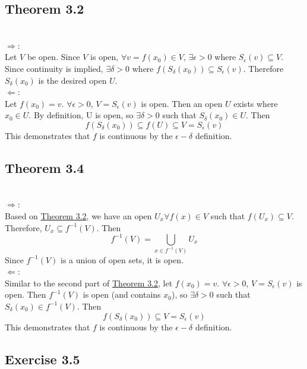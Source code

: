 \subsection{Theorem 3.2} \label{thm4.3.2}
\setcounter{question}{0}

 
 
\begin{solution}
 \\$\Rightarrow$: \\
 Let $V$ be open. Since $V$ is open, $\forall v = f(x_0) \in V$, $\exists \epsilon > 0$ where $S_\epsilon(v) \subseteq V$. Since continuity is implied, $\exists \delta > 0$ where $f(S_\delta(x_0)) \subseteq S_\epsilon(v)$. Therefore $S_\delta(x_0)$ is the desired open $U$. \\
 $\Leftarrow$: \\
 Let $f(x_0) = v$. $\forall \epsilon > 0$, $V = S_\epsilon(v)$ is open. Then an open $U$ exists where $x_0 \in U$. By definition, U is open, so $\exists \delta > 0$ such that $S_\delta(x_0) \in U$. Then
 $$f(S_\delta(x_0)) \subseteq f(U) \subseteq V = S_\epsilon(v)$$
 This demonstrates that $f$ is continuous by the $\epsilon-\delta$ definition.
\end{solution}

\subsection{Theorem 3.4}
\setcounter{question}{0}


\begin{solution}
 \\$\Rightarrow$: \\
 Based on \hyperref[thm4.3.2]{Theorem 3.2}, we have an open $U_x \forall f(x) \in V$ such that $f(U_x) \subseteq V$. Therefore, $U_x \subseteq f^{-1}(V)$. Then
 $$f^{-1}(V) = \bigcup_{x \in f^{-1}(V)} U_x$$
 Since $f^{-1}(V)$ is a union of open sets, it is open. \\
 $\Leftarrow$: \\
 Similar to the second part of \hyperref[thm4.3.2]{Theorem 3.2}, let $f(x_0) = v$. $\forall \epsilon > 0$, $V = S_\epsilon(v)$ is open. Then $f^{-1}(V)$ is open (and contains $x_0$), so $\exists \delta > 0$ such that $S_\delta(x_0) \in f^{-1}(V)$. Then
 $$f(S_\delta(x_0)) \subseteq V = S_\epsilon(v)$$
 This demonstrates that $f$ is continuous by the $\epsilon-\delta$ definition.
\end{solution}

\subsection{Exercise 3.5}
\setcounter{question}{0}

